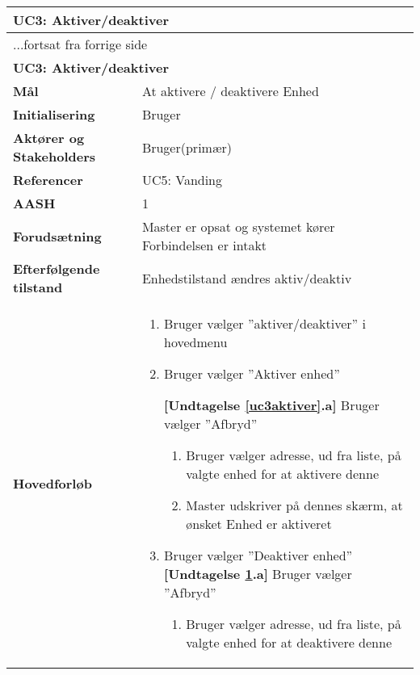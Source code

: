 \begin{center} \centering \label{UC3} 
	\begin{longtable}{|p{5cm}|p{9cm}|}  %
	\hline
		\multicolumn{2}{|l|}{\textbf{UC3: Aktiver/deaktiver}} \\\hline %
		\endfirsthead
		
		\multicolumn{2}{l}{...fortsat fra forrige side} \\ \hline %
		\multicolumn{2}{|l|}{\textbf{UC3: Aktiver/deaktiver}} \\\hline %
		\endhead	
		
		\textbf{Mål}								&At aktivere / deaktivere Enhed	\\\hline
		\textbf{Initialisering}					&Bruger				\\\hline
		\textbf{Aktører og Stakeholders}			&Bruger(primær)		\\\hline
		\textbf{Referencer}						&UC5: Vanding		\\\hline
		\textbf{AASH}							&1					\\\hline
		\textbf{Forudsætning}					&Master er opsat og systemet kører \newline
												 Forbindelsen er intakt	\\\hline
		\textbf{Efterfølgende tilstand}			&Enhedstilstand ændres aktiv/deaktiv\\\hline
		\textbf{Hovedforløb}					
			&\begin{enumerate}
	
	
				\item Bruger vælger ''aktiver/deaktiver'' i hovedmenu
				
				\item \label{uc3aktiver} Bruger vælger ''Aktiver enhed''
				
				\textbf{[Undtagelse \ref{uc3aktiver}.a]} \newline
					Bruger vælger ''Afbryd''
				
			\begin{enumerate}				
				\item Bruger vælger adresse, ud fra liste, på valgte enhed for at aktivere denne
				
				\item Master udskriver på dennes skærm, at ønsket Enhed er aktiveret		
			\end{enumerate}
				\item \label{uc3deaktiver} Bruger vælger ''Deaktiver enhed''
				\textbf{[Undtagelse \ref{uc3deaktiver}.a]} \newline
					Bruger vælger ''Afbryd''
			\begin{enumerate}		
				\item Bruger vælger adresse, ud fra liste, på valgte enhed for at deaktivere denne
				

\end{enumerate}
\end{enumerate}
\end{longtable}
\end{center}
